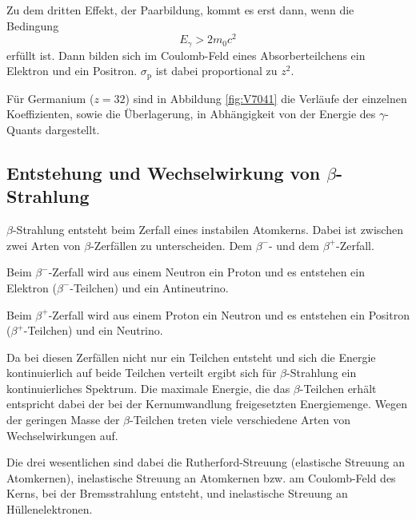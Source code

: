 \documentclass[
  bibliography=totoc,     %
  captions=tableheading,  %
  titlepage=firstiscover, %
]{scrartcl}
\begin{document}
\noindent
Zu dem dritten Effekt, der Paarbildung, kommt es erst dann, wenn die Bedingung
\begin{equation}
  E_\gamma > 2 m_0 c^2
\end{equation}
erfüllt ist. Dann bilden sich im Coulomb-Feld eines Absorberteilchens ein Elektron
und ein Positron. $\sigma_\mathup{p}$ ist dabei proportional zu $z^2$.

\noindent
Für Germanium ($z = 32$) sind in Abbildung \ref{fig:V7041} die Verläufe der einzelnen
Koeffizienten, sowie die Überlagerung, in Abhängigkeit von der Energie des
$\gamma$-Quants dargestellt.

\subsection{Entstehung und Wechselwirkung von \texorpdfstring{$\beta$}{beta}-Strahlung}
$\beta$-Strahlung entsteht beim Zerfall eines instabilen Atomkerns.
Dabei ist zwischen zwei Arten von $\beta$-Zerfällen zu unterscheiden.
Dem $\beta^-$- und dem $\beta^+$-Zerfall.

\noindent
Beim $\beta^-$-Zerfall wird aus einem Neutron ein Proton und es entstehen
ein Elektron ($\beta^-$-Teilchen) und ein Antineutrino.

\noindent
Beim $\beta^+$-Zerfall wird aus einem Proton ein Neutron und es entstehen
ein Positron ($\beta^+$-Teilchen) und ein Neutrino.

\noindent
Da bei diesen Zerfällen nicht nur ein Teilchen entsteht und sich die Energie
kontinuierlich auf beide Teilchen verteilt ergibt sich für $\beta$-Strahlung
ein kontinuierliches Spektrum. Die maximale Energie, die das $\beta$-Teilchen
erhält entspricht dabei der bei der Kernumwandlung freigesetzten Energiemenge.
Wegen der geringen Masse der $\beta$-Teilchen treten viele verschiedene Arten
von Wechselwirkungen auf.

\noindent
Die drei wesentlichen sind dabei die Rutherford-Streuung (elastische Streuung
an Atomkernen), inelastische Streuung an Atomkernen bzw. am Coulomb-Feld des
Kerns, bei der Bremsstrahlung entsteht, und inelastische Streuung an
Hüllenelektronen.
\end{document}
